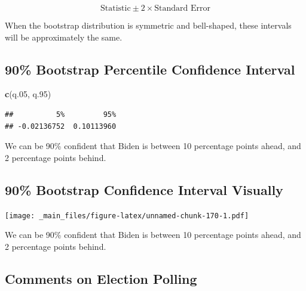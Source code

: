 \documentclass[]{book}
\newenvironment{Shaded}{\begin{snugshade}}{\end{snugshade}}
\newcommand{\KeywordTok}[1]{\textcolor[rgb]{0.13,0.29,0.53}{\textbf{#1}}}
\newcommand{\DecValTok}[1]{\textcolor[rgb]{0.00,0.00,0.81}{#1}}
\newcommand{\FloatTok}[1]{\textcolor[rgb]{0.00,0.00,0.81}{#1}}
\newcommand{\StringTok}[1]{\textcolor[rgb]{0.31,0.60,0.02}{#1}}
\newcommand{\OperatorTok}[1]{\textcolor[rgb]{0.81,0.36,0.00}{\textbf{#1}}}
\newcommand{\NormalTok}[1]{#1}
\begin{document}
\[ \text{Statistic} \pm 2\times\text{Standard Error}
\]

When the bootstrap distribution is symmetric and bell-shaped, these
intervals will be approximately the same.

\subsection{90\% Bootstrap Percentile Confidence
Interval}\label{bootstrap-percentile-confidence-interval-1}

\begin{Shaded}
\end{Shaded}

\begin{Shaded}
\begin{Highlighting}[]
\KeywordTok{c}\NormalTok{(q.}\DecValTok{05}\NormalTok{, q.}\DecValTok{95}\NormalTok{)}
\end{Highlighting}
\end{Shaded}

\begin{verbatim}
##          5%         95% 
## -0.02136752  0.10113960
\end{verbatim}

We can be 90\% confident that Biden is between 10 percentage points
ahead, and 2 percentage points behind.

\subsection{90\% Bootstrap Confidence Interval
Visually}\label{bootstrap-confidence-interval-visually}

\texttt{[image: \_main\_files/figure-latex/unnamed-chunk-170-1.pdf]}

We can be 90\% confident that Biden is between 10 percentage points
ahead, and 2 percentage points behind.

\subsection{Comments on Election
Polling}\label{comments-on-election-polling}
\end{document}
